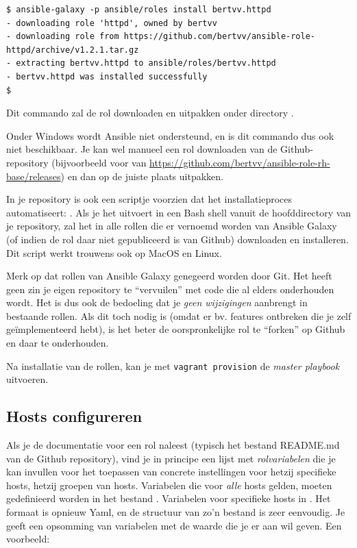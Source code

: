 \begin{verbatim}
$ ansible-galaxy -p ansible/roles install bertvv.httpd
- downloading role 'httpd', owned by bertvv
- downloading role from https://github.com/bertvv/ansible-role-httpd/archive/v1.2.1.tar.gz
- extracting bertvv.httpd to ansible/roles/bertvv.httpd
- bertvv.httpd was installed successfully
$
\end{verbatim}

Dit commando zal de rol  downloaden en uitpakken onder directory .

Onder Windows wordt Ansible niet ondersteund, en is dit commando dus ook niet beschikbaar. Je kan wel manueel een rol downloaden van de Github-repository (bijvoorbeeld voor  van \url{https://github.com/bertvv/ansible-role-rh-base/releases}) en dan op de juiste plaats uitpakken.

In je repository is ook een scriptje voorzien dat het installatieproces automatiseert: . Als je het uitvoert in een Bash shell vanuit de hoofddirectory van je repository, zal het in  alle rollen die er vernoemd worden van Ansible Galaxy (of indien de rol daar niet gepubliceerd is van Github) downloaden en installeren. Dit script werkt trouwens ook op MacOS en Linux.

Merk op dat rollen van Ansible Galaxy genegeerd worden door Git. Het heeft geen zin je eigen repository te ``vervuilen'' met code die al elders onderhouden wordt. Het is dus ook de bedoeling dat je \emph{geen wijzigingen} aanbrengt in bestaande rollen. Als dit toch nodig is (omdat er bv. features ontbreken die je zelf geïmplementeerd hebt), is het beter de oorspronkelijke rol te ``forken'' op Github en daar te onderhouden.

Na installatie van de rollen, kan je met \texttt{vagrant\ provision} de \emph{master playbook} uitvoeren.

\subsection{Hosts configureren}
\label{sub:hosts-configureren}

Als je de documentatie voor een rol naleest (typisch het bestand README.md van de Github repository), vind je in principe een lijst met \emph{rolvariabelen} die je kan invullen voor het toepassen van concrete instellingen voor hetzij specifieke hosts, hetzij groepen van hosts. Variabelen die voor \emph{alle} hosts gelden, moeten gedefinieerd worden in het bestand . Variabelen voor specifieke hosts in . Het formaat is opnieuw Yaml, en de structuur van zo'n bestand is zeer eenvoudig. Je geeft een opsomming van variabelen met de waarde die je er aan wil geven. Een voorbeeld:

